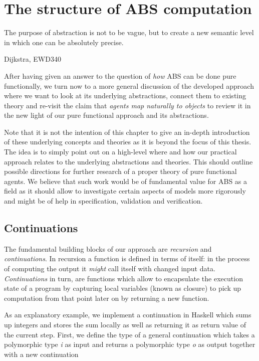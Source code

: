 \chapter{The structure of ABS computation}
\epigraph{The purpose of abstraction is not to be vague, but to create a new semantic level in which one can be absolutely precise.}{Dijkstra, EWD340}
\label{ch:structure_abs_computation}


After having given an answer to the question of \textit{how} ABS can be done pure functionally, we turn now to a more general discussion of the developed approach where we want to look at its underlying abstractions, connect them to existing theory and re-visit the claim that \textit{agents map naturally to objects} \cite{north_managing_2007} to review it in the new light of our pure functional approach and its abstractions.

Note that it is not the intention of this chapter to give an in-depth introduction of these underlying concepts and theories as it is beyond the focus of this thesis. The idea is to simply point out on a high-level where and how our practical approach relates to the underlying abstractions and theories. This should outline possible directions for further research of a proper theory of pure functional agents. We believe that such work would be of fundamental value for ABS as a field as it should allow to investigate certain aspects of models more rigorously and might be of help in specification, validation and verification.

\section{Continuations}
The fundamental building blocks of our approach are \textit{recursion} and \textit{continuations}. In recursion a function is defined in terms of itself: in the process of computing the output it \textit{might} call itself with changed input data. \textit{Continuations} in turn, are functions which allow to encapsulate the execution state of a program by capturing local variables (known as closure) to pick up computation from that point later on by returning a new function.

As an explanatory example, we implement a continuation in Haskell which sums up integers and stores the sum locally as well as returning it as return value of the current step. First, we define the type of a general continuation which takes a polymorphic type \textit{i} as input and returns a polymorphic type \textit{o} as output together with a new continuation

